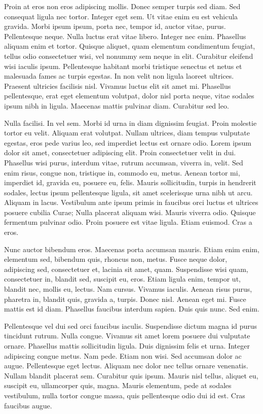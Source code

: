Proin at eros non eros adipiscing mollis. Donec semper turpis sed diam. Sed consequat ligula nec tortor. Integer eget sem. Ut vitae enim eu est vehicula gravida. Morbi ipsum ipsum, porta nec, tempor id, auctor vitae, purus. Pellentesque neque. Nulla luctus erat vitae libero. Integer nec enim. Phasellus aliquam enim et tortor. Quisque aliquet, quam elementum condimentum feugiat, tellus odio consectetuer wisi, vel nonummy sem neque in elit. Curabitur eleifend wisi iaculis ipsum. Pellentesque habitant morbi tristique senectus et netus et malesuada fames ac turpis egestas. In non velit non ligula laoreet ultrices. Praesent ultricies facilisis nisl. Vivamus luctus elit sit amet mi. Phasellus pellentesque, erat eget elementum volutpat, dolor nisl porta neque, vitae sodales ipsum nibh in ligula. Maecenas mattis pulvinar diam. Curabitur sed leo.

Nulla facilisi. In vel sem. Morbi id urna in diam dignissim feugiat. Proin molestie tortor eu velit. Aliquam erat volutpat. Nullam ultrices, diam tempus vulputate egestas, eros pede varius leo, sed imperdiet lectus est ornare odio. Lorem ipsum dolor sit amet, consectetuer adipiscing elit. Proin consectetuer velit in dui. Phasellus wisi purus, interdum vitae, rutrum accumsan, viverra in, velit. Sed enim risus, congue non, tristique in, commodo eu, metus. Aenean tortor mi, imperdiet id, gravida eu, posuere eu, felis. Mauris sollicitudin, turpis in hendrerit sodales, lectus ipsum pellentesque ligula, sit amet scelerisque urna nibh ut arcu. Aliquam in lacus. Vestibulum ante ipsum primis in faucibus orci luctus et ultrices posuere cubilia Curae; Nulla placerat aliquam wisi. Mauris viverra odio. Quisque fermentum pulvinar odio. Proin posuere est vitae ligula. Etiam euismod. Cras a eros.

Nunc auctor bibendum eros. Maecenas porta accumsan mauris. Etiam enim enim, elementum sed, bibendum quis, rhoncus non, metus. Fusce neque dolor, adipiscing sed, consectetuer et, lacinia sit amet, quam. Suspendisse wisi quam, consectetuer in, blandit sed, suscipit eu, eros. Etiam ligula enim, tempor ut, blandit nec, mollis eu, lectus. Nam cursus. Vivamus iaculis. Aenean risus purus, pharetra in, blandit quis, gravida a, turpis. Donec nisl. Aenean eget mi. Fusce mattis est id diam. Phasellus faucibus interdum sapien. Duis quis nunc. Sed enim.

Pellentesque vel dui sed orci faucibus iaculis. Suspendisse dictum magna id purus tincidunt rutrum. Nulla congue. Vivamus sit amet lorem posuere dui vulputate ornare. Phasellus mattis sollicitudin ligula. Duis dignissim felis et urna. Integer adipiscing congue metus. Nam pede. Etiam non wisi. Sed accumsan dolor ac augue. Pellentesque eget lectus. Aliquam nec dolor nec tellus ornare venenatis. Nullam blandit placerat sem. Curabitur quis ipsum. Mauris nisl tellus, aliquet eu, suscipit eu, ullamcorper quis, magna. Mauris elementum, pede at sodales vestibulum, nulla tortor congue massa, quis pellentesque odio dui id est. Cras faucibus augue.

